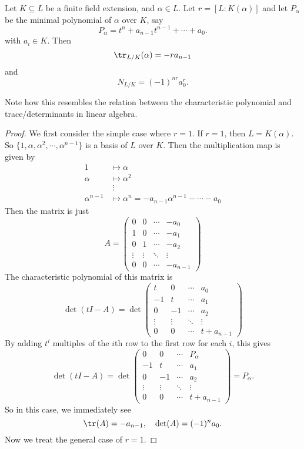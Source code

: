 \documentclass[a4paper]{article}
\begin{document}
\begin{thm}
  Let $K\subseteq L$ be a finite field extension, and $\alpha \in L$. Let $r = [L:K(\alpha)]$ and let $P_\alpha$ be the minimal polynomial of $\alpha$ over $K$, say
  \[
    P_\alpha = t^n + a_{n - 1} t^{n - 1} + \cdots + a_0.
  \]
  with $a_i \in K$. Then
  \[
    \tr_{L/K}(\alpha) = - r a_{n - 1}
  \]
  and
  \[
    N_{L/K} = (-1)^{nr} a_0^r.
  \]
\end{thm}
Note how this resembles the relation between the characteristic polynomial and trace/determinants in linear algebra.

\begin{proof}
  We first consider the simple case where $r = 1$. If $r = 1$, then $L = K(\alpha)$. So $\{1, \alpha, \alpha^2, \cdots, \alpha^{n - 1}\}$ is a basis of $L$ over $K$. Then the multiplication map is given by
  \begin{align*}
      1 &\mapsto \alpha\\
      \alpha &\mapsto \alpha^2\\
      &\;\vdots\\
      \alpha^{n-1} &\mapsto \alpha^n = -a_{n - 1} \alpha^{n - 1} - \cdots - a_0
  \end{align*}
  Then the matrix is just
  \[
    A = \begin{pmatrix}
      0 & 0 & \cdots & -a_0\\
      1 & 0 & \cdots & -a_1\\
      0 & 1 & \cdots & -a_2\\
      \vdots & \vdots & \ddots & \vdots\\
      0 & 0 & \cdots & -a_{n - 1}
    \end{pmatrix}
  \]
  The characteristic polynomial of this matrix is
  \[
    \det(tI - A) = \det
    \begin{pmatrix}
      t & 0 & \cdots & a_0\\
      -1 & t & \cdots & a_1\\
      0 & -1 & \cdots & a_2\\
      \vdots & \vdots & \ddots & \vdots\\
      0 & 0 & \cdots & t + a_{n - 1}
    \end{pmatrix}
  \]
  By adding $t^i$ multiples of the $i$th row to the first row for each $i$, this gives
  \[
    \det (tI - A) = \det
    \begin{pmatrix}
      0 & 0 & \cdots & P_\alpha\\
      -1 & t & \cdots & a_1\\
      0 & -1 & \cdots & a_2\\
      \vdots & \vdots & \ddots & \vdots\\
      0 & 0 & \cdots & t + a_{n - 1}
    \end{pmatrix} = P_\alpha.
  \]
  So in this case, we immediately see
  \[
    \tr (A) = -a_{n - 1},\quad \det (A) = (-1)^n a_0.
  \]
  Now we treat the general case of $r = 1$.


\end{proof}
\end{document}
